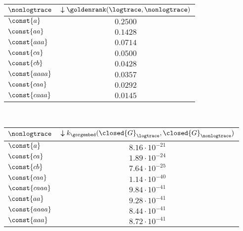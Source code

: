 \begin{table}[!t]
{\begin{tabular}{l|c}
			{$\nonlogtrace$} &
			{$\boldsymbol{\downarrow}\goldenrank(\logtrace,\nonlogtrace)$} \\
			
			
			\midrule
			$\const{a}$  &  $0.2500$ \\
			$\const{aa}$  &  $0.1428$  \\
			$\const{aaa}$  & $0.0714$ \\
			$\const{ca}$  &   $0.0500$\\
			$\const{cb}$  & $0.0428$ \\
			$\const{aaaa}$  &  $0.0357$ \\
			$\const{caa}$  &  $0.0292$ \\
			$\const{caaa}$  &   $0.0145$ \\
			\bottomrule
		\end{tabular}\	\begin{tabular}{l|c}
			\toprule
			
			{$\nonlogtrace$} &
			{$\boldsymbol{\downarrow}k_{\gorgembed}(\closed{G}_\logtrace,\closed{G}_{\nonlogtrace})$} \\
			
			
			\midrule
			$\const{a}$  & $8.16\cdot 10^{-21}$ \\
			$\const{ca}$  &   $1.89\cdot 10^{-24}$\\
			$\const{cb}$  &   $7.64\cdot 10^{-25}$\\
			$\const{caa}$  &$1.14\cdot 10^{-40}$\\
			$\const{caaa}$  &  $9.84\cdot 10^{-41}$\\
			$\const{aa}$  &  $9.28\cdot 10^{-41}$ \\
			$\const{aaaa}$  & $8.44\cdot 10^{-41}$\\
			$\const{aaa}$  &  $8.72\cdot 10^{-41}$\\
			\bottomrule
	\end{tabular}}
\end{table}




